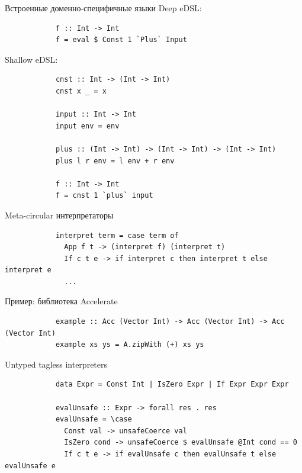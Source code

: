     \begin{frame}[fragile]{Встроенные доменно-специфичные языки}
        Deep eDSL:
        \begin{verbatim}
            f :: Int -> Int
            f = eval $ Const 1 `Plus` Input
        \end{verbatim}
        \pause\vspace{1em}
        Shallow eDSL:
        \begin{verbatim}
            cnst :: Int -> (Int -> Int)
            cnst x _ = x

            input :: Int -> Int
            input env = env

            plus :: (Int -> Int) -> (Int -> Int) -> (Int -> Int)
            plus l r env = l env + r env

            f :: Int -> Int
            f = cnst 1 `plus` input
        \end{verbatim}
    \end{frame}

    \begin{frame}[fragile]{Meta-circular интерпретаторы}
        \pause
        \begin{verbatim}
            interpret term = case term of
              App f t -> (interpret f) (interpret t)
              If c t e -> if interpret c then interpret t else interpret e
              ...
        \end{verbatim}
    \end{frame}

    \begin{frame}[fragile]{Пример: библиотека Accelerate}
        \pause
        \begin{verbatim}
            example :: Acc (Vector Int) -> Acc (Vector Int) -> Acc (Vector Int)
            example xs ys = A.zipWith (+) xs ys
        \end{verbatim}
    \end{frame}


    \begin{frame}[fragile]{Untyped tagless interpreters}
        \pause
        \begin{verbatim}
            data Expr = Const Int | IsZero Expr | If Expr Expr Expr

            evalUnsafe :: Expr -> forall res . res
            evalUnsafe = \case
              Const val -> unsafeCoerce val
              IsZero cond -> unsafeCoerce $ evalUnsafe @Int cond == 0
              If c t e -> if evalUnsafe c then evalUnsafe t else evalUnsafe e
        \end{verbatim}
    \end{frame}


